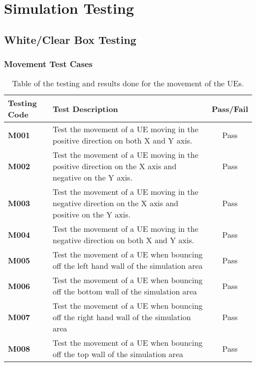 \chapter{Simulation Testing}\label{testing}
\section{White/Clear Box Testing}
\subsection{Movement Test Cases}
\begin{table}[H]
  \begin{center}
    \begin{tabular}{| l | p{8cm} | c |}
  	  \hline
      \textbf{Testing Code} & \textbf{Test Description} & \textbf{Pass/Fail} \\ \hline
      \textbf{M001} & Test the movement of a UE moving in the positive direction on both X and Y axis. & Pass \\ \hline
      \textbf{M002} & Test the movement of a UE moving in the positive direction on the X axis and negative on the Y axis. & Pass \\ \hline
      \textbf{M003} & Test the movement of a UE moving in the negative direction on the X axis and positive on the Y axis. & Pass \\ \hline
      \textbf{M004} & Test the movement of a UE moving in the negative direction on both X and Y axis. & Pass \\ \hline
      \textbf{M005} & Test the movement of a UE when bouncing off the left hand wall of the simulation area & Pass \\ \hline
      \textbf{M006} & Test the movement of a UE when bouncing off the bottom wall of the simulation area & Pass \\ \hline
      \textbf{M007} & Test the movement of a UE when bouncing off the right hand wall of the simulation area & Pass \\ \hline
      \textbf{M008} & Test the movement of a UE when bouncing off the top wall of the simulation area & Pass \\ \hline
  	\end{tabular}
  \end{center}
  \caption{Table of the testing and results done for the movement of the UEs.}
  \label{tab:test_move}
\end{table}

